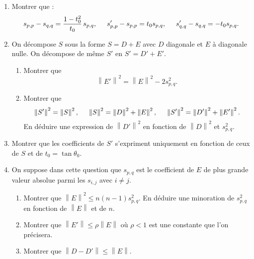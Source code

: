 \begin{enumerate}
 \item Montrer que :
\begin{displaymath}
 s_{p,p} - s_{q,q} = \frac{1-t_0^2}{t_0}\,s_{p,q}, \hspace{0.5cm}
 s'_{p,p} - s_{p,p} = t_0s_{p,q}, \hspace{0.5cm}
 s'_{q,q} - s_{q,q} = -t_0 s_{p,q}.
\end{displaymath}

 \item On décompose $S$ sous la forme $S = D + E$ avec $D$ diagonale et $E$ à diagonale nulle. On décompose de même $S'$ en $S' = D' +E'$.
\begin{enumerate}
 \item Montrer que
\begin{displaymath}
 \left\| E'\right\|^2 = \left\| E\right\|^2 -2 s_{p,q}^2. 
\end{displaymath}
 \item Montrer que 
\begin{displaymath}
 \left\| S'\right\|^2 = \left\| S\right\|^2, \hspace{0.5cm}
 \left\| S\right\|^2 = \left\| D\right\|^2 + \left\| E\right\|^2, \hspace{0.5cm}
 \left\| S'\right\|^2 = \left\| D'\right\|^2 + \left\| E'\right\|^2.
\end{displaymath}
En déduire une expression de $\left\| D'\right\|^2$ en fonction de $\left\| D\right\|^2$ et $s_{p,q}^2$.
\end{enumerate}

 \item Montrer que les coefficients de $S'$ s'expriment uniquement en fonction de ceux de $S$ et de $t_0 = \tan \theta_0$.
 
 \item On suppose dans cette question que $s_{p,q}$ est le coefficient de $E$ de plus grande valeur absolue parmi les $s_{i,j}$ avec $i\neq j$.
\begin{enumerate}
 \item Montrer que $\left\| E\right\|^2 \leq n(n-1)s_{p,q}^2$. En déduire une minoration de $s_{p,q}^2$ en fonction de $\left\|E \right\|$ et de $n$. 
 \item Montrer que $\left\|E' \right\| \leq \rho \left\|E \right\|$ où $\rho < 1$ est une constante que l'on précisera.
 \item Montrer que $\left\|D - D' \right\| \leq \left\|E \right\|$.
\end{enumerate}


\end{enumerate}
